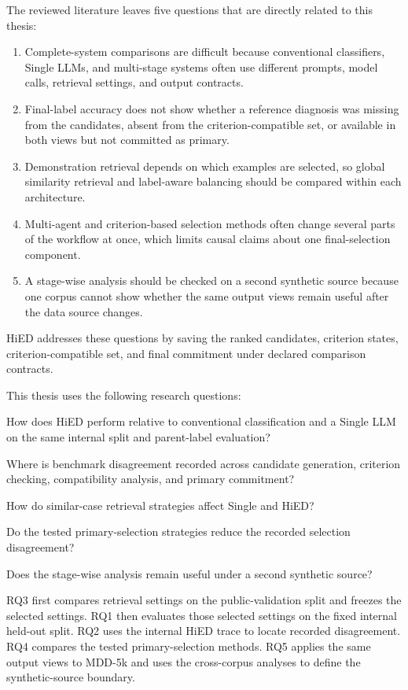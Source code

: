 The reviewed literature leaves five questions that are directly related to this thesis:

\begin{enumerate}
    \item Complete-system comparisons are difficult because conventional classifiers, Single LLMs, and multi-stage systems often use different prompts, model calls, retrieval settings, and output contracts.
    \item Final-label accuracy does not show whether a reference diagnosis was missing from the candidates, absent from the criterion-compatible set, or available in both views but not committed as primary.
    \item Demonstration retrieval depends on which examples are selected, so global similarity retrieval and label-aware balancing should be compared within each architecture.
    \item Multi-agent and criterion-based selection methods often change several parts of the workflow at once, which limits causal claims about one final-selection component.
    \item A stage-wise analysis should be checked on a second synthetic source because one corpus cannot show whether the same output views remain useful after the data source changes.
\end{enumerate}

HiED addresses these questions by saving the ranked candidates, criterion states, criterion-compatible set, and final commitment under declared comparison contracts.

This thesis uses the following research questions:

\begin{description}[style=nextline,leftmargin=1.5cm,labelwidth=1.1cm,itemsep=0pt,parsep=0pt,topsep=0pt,partopsep=0pt]
\item[RQ1] How does HiED perform relative to conventional classification and a Single LLM on the same internal split and parent-label evaluation?
\item[RQ2] Where is benchmark disagreement recorded across candidate generation, criterion checking, compatibility analysis, and primary commitment?
\item[RQ3] How do similar-case retrieval strategies affect Single and HiED?
\item[RQ4] Do the tested primary-selection strategies reduce the recorded selection disagreement?
\item[RQ5] Does the stage-wise analysis remain useful under a second synthetic source?
\end{description}

RQ3 first compares retrieval settings on the public-validation split and freezes the selected settings. RQ1 then evaluates those selected settings on the fixed internal held-out split. RQ2 uses the internal HiED trace to locate recorded disagreement. RQ4 compares the tested primary-selection methods. RQ5 applies the same output views to MDD-5k and uses the cross-corpus analyses to define the synthetic-source boundary.
